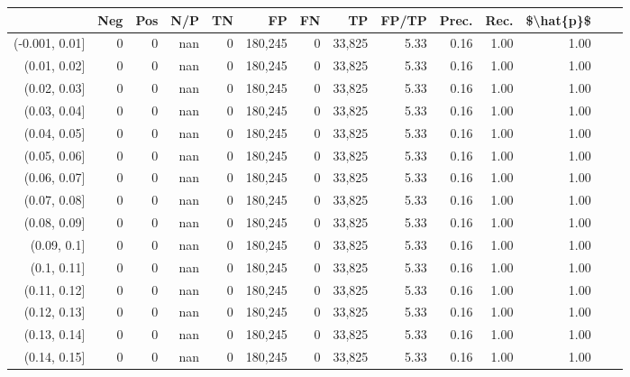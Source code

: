 \begin{tabular}{rrrrrrrrrrrrrr}
\toprule
{} &      Neg &     Pos &    N/P &       TN &       FP &      FN &      TP & FP/TP & Prec. &  Rec. & \$\textbackslash hat\{p\}\$ \\
\midrule
(-0.001, 0.01] &        0 &       0 &    nan &        0 &  180,245 &       0 &  33,825 &  5.33 &  0.16 &  1.00 &      1.00 \\
(0.01, 0.02]   &        0 &       0 &    nan &        0 &  180,245 &       0 &  33,825 &  5.33 &  0.16 &  1.00 &      1.00 \\
(0.02, 0.03]   &        0 &       0 &    nan &        0 &  180,245 &       0 &  33,825 &  5.33 &  0.16 &  1.00 &      1.00 \\
(0.03, 0.04]   &        0 &       0 &    nan &        0 &  180,245 &       0 &  33,825 &  5.33 &  0.16 &  1.00 &      1.00 \\
(0.04, 0.05]   &        0 &       0 &    nan &        0 &  180,245 &       0 &  33,825 &  5.33 &  0.16 &  1.00 &      1.00 \\
(0.05, 0.06]   &        0 &       0 &    nan &        0 &  180,245 &       0 &  33,825 &  5.33 &  0.16 &  1.00 &      1.00 \\
(0.06, 0.07]   &        0 &       0 &    nan &        0 &  180,245 &       0 &  33,825 &  5.33 &  0.16 &  1.00 &      1.00 \\
(0.07, 0.08]   &        0 &       0 &    nan &        0 &  180,245 &       0 &  33,825 &  5.33 &  0.16 &  1.00 &      1.00 \\
(0.08, 0.09]   &        0 &       0 &    nan &        0 &  180,245 &       0 &  33,825 &  5.33 &  0.16 &  1.00 &      1.00 \\
(0.09, 0.1]    &        0 &       0 &    nan &        0 &  180,245 &       0 &  33,825 &  5.33 &  0.16 &  1.00 &      1.00 \\
(0.1, 0.11]    &        0 &       0 &    nan &        0 &  180,245 &       0 &  33,825 &  5.33 &  0.16 &  1.00 &      1.00 \\
(0.11, 0.12]   &        0 &       0 &    nan &        0 &  180,245 &       0 &  33,825 &  5.33 &  0.16 &  1.00 &      1.00 \\
(0.12, 0.13]   &        0 &       0 &    nan &        0 &  180,245 &       0 &  33,825 &  5.33 &  0.16 &  1.00 &      1.00 \\
(0.13, 0.14]   &        0 &       0 &    nan &        0 &  180,245 &       0 &  33,825 &  5.33 &  0.16 &  1.00 &      1.00 \\
(0.14, 0.15]   &        0 &       0 &    nan &        0 &  180,245 &       0 &  33,825 &  5.33 &  0.16 &  1.00 &      1.00 \\

\end{tabular}
